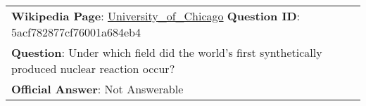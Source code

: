 \begin{figure*}[ht]
{\begin{tabular}{p{}}
            \textbf{Wikipedia Page}: \underline{University\_of\_Chicago} \textbf{Question ID}: 5acf782877cf76001a684eb4                                                                                                                                                                                                                                                                                                                                                                                                                                                                                                                                                                                                                                                                                                                                                                                                                                                                                                                                                                  \\
            \textbf{Question}: Under which field did the world's first synthetically produced nuclear reaction occur?                                                                                                                                                                                                                                                                                                                                                                                                                                                                                                                                                                                                                                                                                                                                                                                                                                                                                                                                                                    \\
            \textbf{Official Answer}: Not Answerable                                                                                                                                                                                                                                                                                                                                                                                                                                                                                                                                                                                                                                                                                                                                                                                                                                                                                                                                                                                                                                     \\

\end{tabular}}
\end{figure*}
